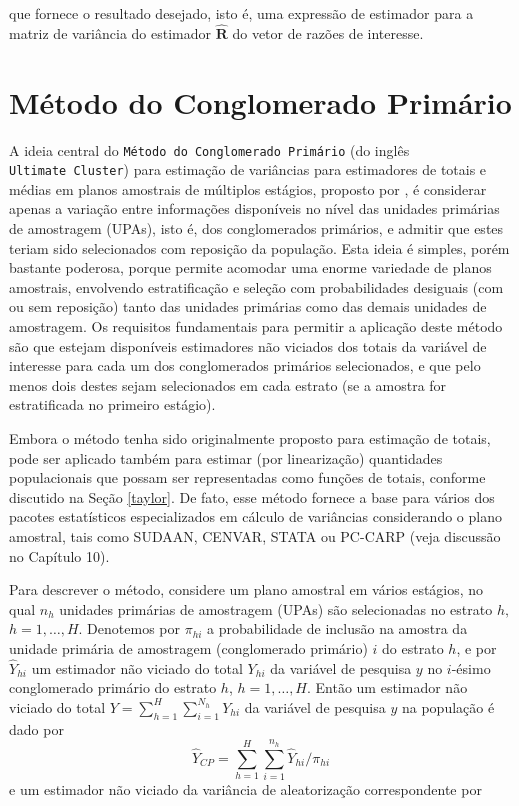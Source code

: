 \documentclass[]{book}
\numberwithin{example}{chapter}
\numberwithin{remark}{chapter}
\numberwithin{definition}{chapter}
\begin{document}
que fornece o resultado desejado, isto é, uma expressão de estimador
para a matriz de variância do estimador \(\widehat{\mathbf{R}}\) do
vetor de razões de interesse.

\section{Método do Conglomerado
Primário}\label{metodo-do-conglomerado-primario}

A ideia central do \texttt{Método\ do\ Conglomerado\ Primário} (do
inglês \texttt{Ultimate\ Cluster}) para estimação de variâncias para
estimadores de totais e médias em planos amostrais de múltiplos
estágios, proposto por \citep{hansen}, é considerar apenas a variação
entre informações disponíveis no nível das unidades primárias de
amostragem (UPAs), isto é, dos conglomerados primários, e admitir que
estes teriam sido selecionados com reposição da população. Esta ideia é
simples, porém bastante poderosa, porque permite acomodar uma enorme
variedade de planos amostrais, envolvendo estratificação e seleção com
probabilidades desiguais (com ou sem reposição) tanto das unidades
primárias como das demais unidades de amostragem. Os requisitos
fundamentais para permitir a aplicação deste método são que estejam
disponíveis estimadores não viciados dos totais da variável de interesse
para cada um dos conglomerados primários selecionados, e que pelo menos
dois destes sejam selecionados em cada estrato (se a amostra for
estratificada no primeiro estágio).

Embora o método tenha sido originalmente proposto para estimação de
totais, pode ser aplicado também para estimar (por linearização)
quantidades populacionais que possam ser representadas como funções de
totais, conforme discutido na Seção \ref{taylor}. De fato, esse método
fornece a base para vários dos pacotes estatísticos especializados em
cálculo de variâncias considerando o plano amostral, tais como SUDAAN,
CENVAR, STATA ou PC-CARP (veja discussão no Capítulo 10).

Para descrever o método, considere um plano amostral em vários estágios,
no qual \(n_{h}\) unidades primárias de amostragem (UPAs) são
selecionadas no estrato \(h,\) \(h=1,\ldots ,H\). Denotemos por
\(\pi_{hi}\) a probabilidade de inclusão na amostra da unidade primária
de amostragem (conglomerado primário) \(i\) do estrato \(h\), e por
\(\widehat{Y}_{hi}\) um estimador não viciado do total \(Y_{hi}\) da
variável de pesquisa \(y\) no \(i\)-ésimo conglomerado primário do
estrato \(h\), \(h=1,\ldots ,H\). Então um estimador não viciado do
total \(Y=\sum_{h=1}^{H}\sum_{i=1}^{N_{h}}Y_{hi}\) da variável de
pesquisa \(y\) na população é dado por \[
\widehat{Y}_{CP}=\sum_{h=1}^{H}\sum_{i=1}^{n_{h}}\widehat{Y}_{hi}/\pi _{hi} 
\] e um estimador não viciado da variância de aleatorização
correspondente por
\end{document}
